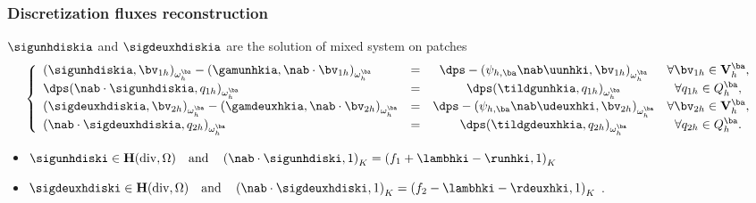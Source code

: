 \documentclass[10 pt]{beamer}
\renewcommand{\div}{\mathrm{div}}
\begin{document}
\begin{frame}
\frametitle{Discretization fluxes reconstruction}
$\sigunhdiskia$ and $\sigdeuxhdiskia$ are the solution of mixed system on patches
\begin{equation*}
\left\lbrace\begin{array}{llccc}
(\sigunhdiskia,{\bv}_{1h})_{\omega_{h}^{\ba}}-(\gamunhkia,\nab \cdot {\bv}_{1h})_{\omega_{h}^{\ba}} &=& \dps -\left(\psi_{h,\ba} \nab \uunhki,{\bv}_{1h}\right)_{\omega_h^{\ba}}  & \forall {\bv}_{1h}\in {\bf V}_{h}^{\ba}, \\
\dps(\nab \cdot \sigunhdiskia,q_{1h})_{\omega_{h}^{\ba}}&=&\dps(\tildgunhkia,q_{1h})_{\omega_{h}^{\ba}} & \forall q_{1h}\in Q_{h}^{\ba},\\
(\sigdeuxhdiskia,{\bv}_{2h})_{\omega_{h}^{\ba}}-(\gamdeuxhkia,\nab \cdot {\bv}_{2h})_{\omega_{h}^{\ba}} &=& \dps-\left(\psi_{h,\ba} \nab \udeuxhki,{\bv}_{2h}\right)_{\omega_h^{\ba}} & \forall {\bv}_{2h}\in {\bf V}_{h}^{\ba},\\
(\nab \cdot \sigdeuxhdiskia,q_{2h})_{\omega_{h}^{\ba}}&=&\dps(\tildgdeuxhkia,q_{2h})_{\omega_{h}^{\ba}} & \forall q_{2h} \in Q_{h}^{\ba}.
\end{array}
\right.
\end{equation*}
\hspace{1.2 cm}
\begin{itemize}
\item
$\sigunhdiski  \in \textbf H(\div,\Omega) \quad \mbox{and} \quad \left(\nab \cdot \sigunhdiski, 1\right)_K = \left(f_1 + \lambhki -\runhki ,1\right)_K$
\item
$\sigdeuxhdiski \in \textbf H(\div,\Omega) \quad \mbox{and} \quad \left(\nab \cdot \sigdeuxhdiski, 1\right)_K = \left(f_2 - \lambhki -\rdeuxhki ,1\right)_K$ .
\end{itemize}



\end{frame}
\end{document}
